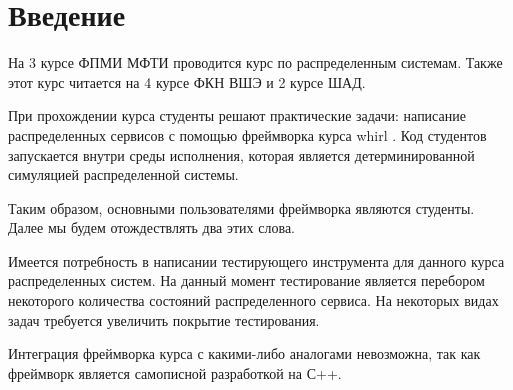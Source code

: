 \section{Введение}
\label{sec:intro}

На 3 курсе ФПМИ МФТИ проводится курс по распределенным системам. Также этот курс читается на 4 курсе ФКН ВШЭ и 2 курсе ШАД.

При прохождении курса студенты решают практические задачи: написание распределенных сервисов с помощью фреймворка курса whirl \cite{whirl}. Код студентов запускается внутри среды исполнения, которая является детерминированной симуляцией распределенной системы.

Таким образом, основными пользователями фреймворка являются студенты. Далее мы будем отождествлять два этих слова.

Имеется потребность в написании тестирующего инструмента для данного курса распределенных систем. На данный момент тестирование является перебором некоторого количества состояний распределенного сервиса. На некоторых видах задач требуется увеличить покрытие тестирования.

Интеграция фреймворка курса с какими-либо аналогами невозможна, так как фреймворк является самописной разработкой на С++.




